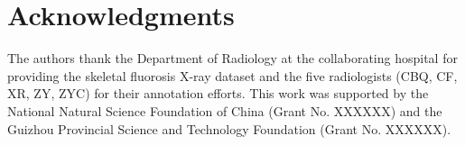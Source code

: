 \documentclass[final,12pt]{elsarticle}
\begin{document}








\section*{Acknowledgments}
The authors thank the Department of Radiology at the collaborating hospital for providing the skeletal fluorosis X-ray dataset and the five radiologists (CBQ, CF, XR, ZY, ZYC) for their annotation efforts. This work was supported by the National Natural Science Foundation of China (Grant No. XXXXXX) and the Guizhou Provincial Science and Technology Foundation (Grant No. XXXXXX).



\end{document}
